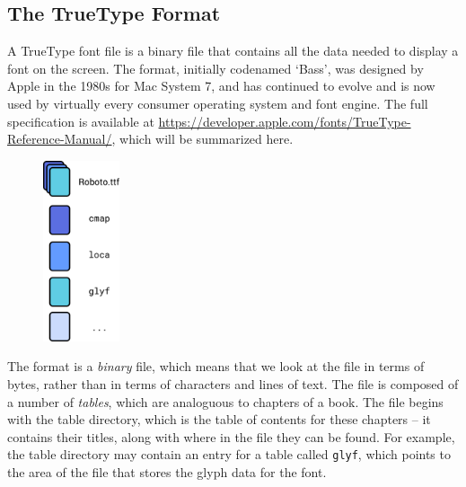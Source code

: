 \documentclass{report}
\begin{document}
\subsection{The TrueType Format}
A TrueType font file is a binary file that contains all the data needed to
display a font on the screen. The format, initially codenamed `Bass', was
designed by Apple in the 1980s for Mac System 7, and has continued to evolve and
is now used by virtually every consumer operating system and font engine. The
full specification is available at
\url{https://developer.apple.com/fonts/TrueType-Reference-Manual/}, which will
be summarized here.
\begin{figure}
  \centering
  \includegraphics[width=0.2\textwidth]{breakdownimg}
\end{figure}
The format is a \textit{binary} file, which means that we look at the file in
terms of bytes, rather than in terms of characters and lines of text. The file
is composed of a number of \textit{tables}, which are analoguous to chapters of
a book. The file begins with the table directory, which is the table of contents
for these chapters -- it contains their titles, along with where in the file
they can be found. For example, the table directory may contain an entry for a
table called \texttt{glyf}, which points to the area of the file that stores the
glyph data for the font. 
\end{document}
